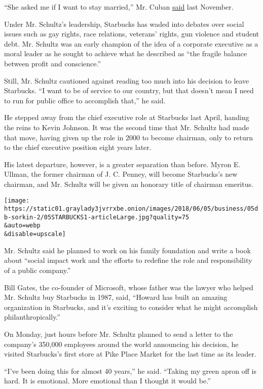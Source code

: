 ``She asked me if I want to stay married,'' Mr. Cuban
\href{https://twitter.com/carlquintanilla/status/928680541137920000}{said}
last November.

Under Mr. Schultz's leadership, Starbucks has waded into debates over
social issues such as gay rights, race relations, veterans' rights, gun
violence and student debt. Mr. Schultz was an early champion of the idea
of a corporate executive as a moral leader as he sought to achieve what
he described as ``the fragile balance between profit and conscience.''

Still, Mr. Schultz cautioned against reading too much into his decision
to leave Starbucks. ``I want to be of service to our country, but that
doesn't mean I need to run for public office to accomplish that,'' he
said.

He stepped away from the chief executive role at Starbucks last April,
handing the reins to Kevin Johnson. It was the second time that Mr.
Schultz had made that move, having given up the role in 2000 to become
chairman, only to return to the chief executive position eight years
later.

His latest departure, however, is a greater separation than before.
Myron E. Ullman, the former chairman of J. C. Penney, will become
Starbucks's new chairman, and Mr. Schultz will be given an honorary
title of chairman emeritus.

\texttt{[image: https://static01.graylady3jvrrxbe.onion/images/2018/06/05/business/05db-sorkin-2/05STARBUCKS1-articleLarge.jpg?quality=75\\\&auto=webp\\\&disable=upscale]}

Mr. Schultz said he planned to work on his family foundation and write a
book about ``social impact work and the efforts to redefine the role and
responsibility of a public company.''

Bill Gates, the co-founder of Microsoft, whose father was the lawyer who
helped Mr. Schultz buy Starbucks in 1987, said, ``Howard has built an
amazing organization in Starbucks, and it's exciting to consider what he
might accomplish philanthropically.''

On Monday, just hours before Mr. Schultz planned to send a letter to the
company's 350,000 employees around the world announcing his decision, he
visited Starbucks's first store at Pike Place Market for the last time
as its leader.

``I've been doing this for almost 40 years,'' he said. ``Taking my green
apron off is hard. It is emotional. More emotional than I thought it
would be.''

